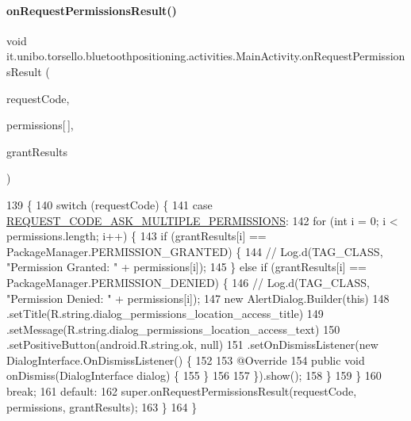 \paragraph{\texorpdfstring{on\+Request\+Permissions\+Result()}{onRequestPermissionsResult()}}
{\footnotesize\ttfamily void it.\+unibo.\+torsello.\+bluetoothpositioning.\+activities.\+Main\+Activity.\+on\+Request\+Permissions\+Result (\begin{DoxyParamCaption}\item[{int}]{request\+Code,  }\item[{@Non\+Null String}]{permissions\mbox{[}$\,$\mbox{]},  }\item[{@Non\+Null int \mbox{[}$\,$\mbox{]}}]{grant\+Results }\end{DoxyParamCaption})}


\begin{DoxyCode}
139                                                                         \{
140         \textcolor{keywordflow}{switch} (requestCode) \{
141             \textcolor{keywordflow}{case} \hyperlink{classit_1_1unibo_1_1torsello_1_1bluetoothpositioning_1_1activities_1_1MainActivity_a319aed5cdd5724e043302babe5fcfeac_a319aed5cdd5724e043302babe5fcfeac}{REQUEST\_CODE\_ASK\_MULTIPLE\_PERMISSIONS}:
142                 \textcolor{keywordflow}{for} (\textcolor{keywordtype}{int} i = 0; i < permissions.length; i++) \{
143                     \textcolor{keywordflow}{if} (grantResults[i] == PackageManager.PERMISSION\_GRANTED) \{
144 \textcolor{comment}{//                        Log.d(TAG\_CLASS, "Permission Granted: " + permissions[i]);}
145                     \} \textcolor{keywordflow}{else} \textcolor{keywordflow}{if} (grantResults[i] == PackageManager.PERMISSION\_DENIED) \{
146 \textcolor{comment}{//                        Log.d(TAG\_CLASS, "Permission Denied: " + permissions[i]);}
147                         \textcolor{keyword}{new} AlertDialog.Builder(\textcolor{keyword}{this})
148                                 .setTitle(R.string.dialog\_permissions\_location\_access\_title)
149                                 .setMessage(R.string.dialog\_permissions\_location\_access\_text)
150                                 .setPositiveButton(android.R.string.ok, null)
151                                 .setOnDismissListener(\textcolor{keyword}{new} DialogInterface.OnDismissListener() \{
152 
153                                     @Override
154                                     \textcolor{keyword}{public} \textcolor{keywordtype}{void} onDismiss(DialogInterface dialog) \{
155                                     \}
156 
157                                 \}).show();
158                     \}
159                 \}
160                 \textcolor{keywordflow}{break};
161             \textcolor{keywordflow}{default}:
162                 super.onRequestPermissionsResult(requestCode, permissions, grantResults);
163         \}
164     \}
\end{DoxyCode}
